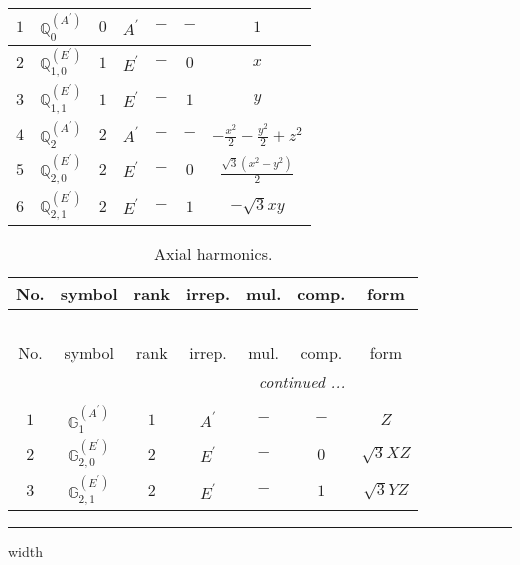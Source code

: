 \documentclass[fleqn,10pt,landscape]{article}
\begin{document}
\begin{itemize}
\begin{center}
\begin{longtable}{ccccccc}
$ 1 $ & $ \mathbb{Q}_{0}^{(A^{\prime})} $ & $ 0 $ & $ A^{\prime} $ & $ - $ & $ - $ & $ 1 $ \\ \hline
$ 2 $ & $ \mathbb{Q}_{1,0}^{(E^{\prime})} $ & $ 1 $ & $ E^{\prime} $ & $ - $ & $ 0 $ & $ x $ \\
$ 3 $ & $ \mathbb{Q}_{1,1}^{(E^{\prime})} $ & $ 1 $ & $ E^{\prime} $ & $ - $ & $ 1 $ & $ y $ \\ \hline
$ 4 $ & $ \mathbb{Q}_{2}^{(A^{\prime})} $ & $ 2 $ & $ A^{\prime} $ & $ - $ & $ - $ & $ - \frac{x^{2}}{2} - \frac{y^{2}}{2} + z^{2} $ \\
$ 5 $ & $ \mathbb{Q}_{2,0}^{(E^{\prime})} $ & $ 2 $ & $ E^{\prime} $ & $ - $ & $ 0 $ & $ \frac{\sqrt{3} \left(x^{2} - y^{2}\right)}{2} $ \\
$ 6 $ & $ \mathbb{Q}_{2,1}^{(E^{\prime})} $ & $ 2 $ & $ E^{\prime} $ & $ - $ & $ 1 $ & $ - \sqrt{3} x y $ \\
\end{longtable}
\end{center}
\begin{center}
\renewcommand{\arraystretch}{1.3}
\begin{longtable}{ccccccc}
\caption{Axial harmonics.}
 \\
 \hline \hline
No. & symbol & rank & irrep. & mul. & comp. & form \\ \hline \endfirsthead

\multicolumn{6}{l}{\tablename\ \thetable{}} \\
 \hline \hline
No. & symbol & rank & irrep. & mul. & comp. & form \\ \hline \endhead

 \hline \hline
\multicolumn{6}{r}{\footnotesize\it continued ...} \\ \endfoot

 \hline \hline
\multicolumn{6}{r}{} \\ \endlastfoot

$ 1 $ & $ \mathbb{G}_{1}^{(A^{\prime})} $ & $ 1 $ & $ A^{\prime} $ & $ - $ & $ - $ & $ Z $ \\ \hline
$ 2 $ & $ \mathbb{G}_{2,0}^{(E^{\prime})} $ & $ 2 $ & $ E^{\prime} $ & $ - $ & $ 0 $ & $ \sqrt{3} X Z $ \\
$ 3 $ & $ \mathbb{G}_{2,1}^{(E^{\prime})} $ & $ 2 $ & $ E^{\prime} $ & $ - $ & $ 1 $ & $ \sqrt{3} Y Z $ \\
\end{longtable}
\end{center}

 \hfil \hrule height 1mm width \textwidth \hfil


\end{itemize}
\end{document}
